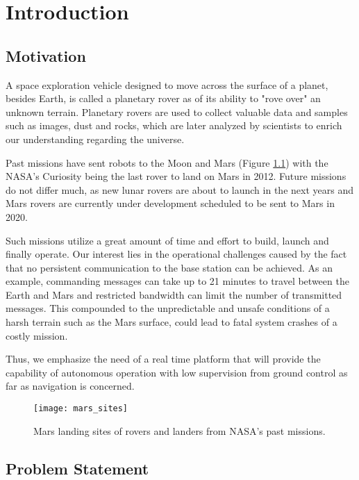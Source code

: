 \label{Chapter1}

\chapter{Introduction}

\section{Motivation}
A space exploration vehicle designed to move across the surface of a planet,
besides Earth, is called a planetary rover as of its ability to "rove over"
an unknown terrain.
Planetary rovers are used to collect valuable data and samples such as
images, dust and rocks, which are later analyzed by scientists to enrich
our understanding regarding the universe.

Past missions have sent robots to the Moon and Mars (Figure
\ref{fig:mars_sites}) with the NASA's Curiosity being the last rover to
land on Mars in 2012.
Future missions do not differ much, as new lunar rovers are about to launch
in the next years and Mars rovers are currently under development scheduled
to be sent to Mars in 2020.

Such missions utilize a great amount of time and effort to build,
launch and finally operate.
Our interest lies in the operational challenges caused by the fact
that no persistent communication to the base station can be achieved.
As an example, commanding messages can take up to 21 minutes to travel
between the Earth and Mars and restricted bandwidth can limit the number
of transmitted messages.
This compounded to the unpredictable and unsafe conditions of
a harsh terrain such as the Mars surface,
could lead to fatal system crashes of a costly mission.

Thus, we emphasize the need of a real time platform that will provide the
capability of autonomous operation with low supervision from ground control
as far as navigation is concerned.

\begin{figure}[h!]
    \centering
    \texttt{[image: mars\_sites]}
    \caption[Mars landing sites]{
        Mars landing sites of rovers and landers from NASA's past missions.
    }
    \label{fig:mars_sites}
\end{figure}

\section{Problem Statement}

